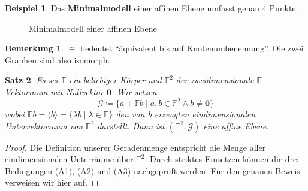 \documentclass[hidelinks]{article}
\theoremstyle{plain}
\newtheorem{thm}{Satz}[section]
\theoremstyle{definition}
\newtheorem{bsp}[thm]{Beispiel}
\theoremstyle{rem}
\newtheorem*{remark}{Bemerkung}
\begin{document}
\begin{sloppypar}
\begin{bsp}
Das \textbf{Minimalmodell} einer affinen Ebene umfasst genau 4 Punkte.\cite[Seite~16]{henn}
\begin{figure}[H]
\centering
{}
\caption{Minimalmodell einer affinen Ebene}
\end{figure}
\begin{remark}
$\cong$ bedeutet ``äquivalent bis auf Knotenumbenennung''. Die zwei Graphen sind also isomorph.
\end{remark}
\end{bsp}

\begin{thm}
	Es sei $\mathbb{F}$ ein beliebiger Körper und $\mathbb{F}^2$ der zweidimensionale $\mathbb{F}$-Vektorraum mit Nullvektor $\boldsymbol 0$. Wir setzen
	\begin{equation*}
		\mathcal{G}\coloneqq\{a+\mathbb{F}b\mid a,b\in\mathbb{F}^2\land b\ne\boldsymbol 0\}
	\end{equation*}
	wobei $\mathbb{F}b=\langle b \rangle=\{\lambda b\mid\lambda\in\mathbb{F}\}$ den von b erzeugten eindimensionalen Untervektorraum von $\mathbb{F}^2$ darstellt. Dann ist $(\mathbb{F}^2,\mathcal{G})$ eine affine Ebene.
\end{thm}
\begin{proof}
	Die Definition unserer Geradenmenge entspricht die Menge aller eindimensionalen Unterräume über $\mathbb{F}^2$. Durch striktes Einsetzen können die drei Bedingungen (A1), (A2) und (A3) nachgeprüft werden. Für den genauen Beweis verweisen wir hier auf\cite[Seite~87]{karpfinger-kiechle}.
\end{proof}


\end{sloppypar}
\end{document}
